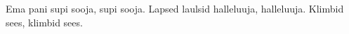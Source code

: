 Ema pani supi sooja, supi sooja.
Lapsed laulsid halleluuja, halleluuja.
Klimbid sees, klimbid sees.

